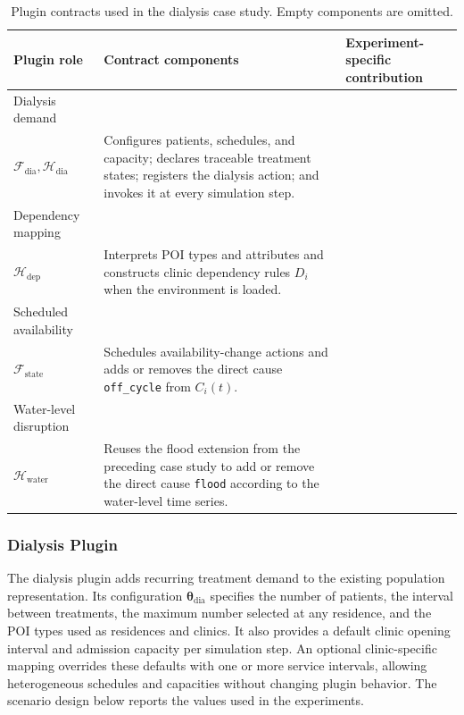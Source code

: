 \begin{table}[htbp]
    \centering
    \small
    \caption{Plugin contracts used in the dialysis case study. Empty components are omitted.}
    \label{tab:dialysis_plugin_contracts}
    \begin{tabularx}{\textwidth}{>{\raggedright\arraybackslash}p{}>{\raggedright\arraybackslash}p{}X}
        \toprule
        \textbf{Plugin role} & \textbf{Contract components} & \textbf{Experiment-specific contribution} \\
        \midrule
        Dialysis demand & \shortstack[l]{$\bm{\theta}_{\mathrm{dia}},\Delta\Sigma_{\mathrm{dia}},$\\$\mathcal{F}_{\mathrm{dia}},\mathcal{H}_{\mathrm{dia}}$} & Configures patients, schedules, and capacity; declares traceable treatment states; registers the dialysis action; and invokes it at every simulation step. \\
        Dependency mapping & \shortstack[l]{$\bm{\theta}_{\mathrm{dep}},\Delta\Sigma_{\mathrm{dep}},$\\$\mathcal{H}_{\mathrm{dep}}$} & Interprets POI types and attributes and constructs clinic dependency rules $D_i$ when the environment is loaded. \\
        Scheduled availability & \shortstack[l]{$\bm{\theta}_{\mathrm{state}},\mathcal{R}_{\mathrm{state}},$\\$\mathcal{F}_{\mathrm{state}}$} & Schedules availability-change actions and adds or removes the direct cause \texttt{off\_cycle} from $C_i(t)$. \\
        Water-level disruption & \shortstack[l]{$\bm{\theta}_{\mathrm{water}},\Delta\Sigma_{\mathrm{water}},$\\$\mathcal{H}_{\mathrm{water}}$} & Reuses the flood extension from the preceding case study to add or remove the direct cause \texttt{flood} according to the water-level time series. \\
        \bottomrule
    \end{tabularx}
\end{table}

\FloatBarrier

\subsubsection{Dialysis Plugin}

The dialysis plugin adds recurring treatment demand to the existing population representation. Its configuration $\bm{\theta}_{\mathrm{dia}}$ specifies the number of patients, the interval between treatments, the maximum number selected at any residence, and the POI types used as residences and clinics. It also provides a default clinic opening interval and admission capacity per simulation step. An optional clinic-specific mapping overrides these defaults with one or more service intervals, allowing heterogeneous schedules and capacities without changing plugin behavior. The scenario design below reports the values used in the experiments.

